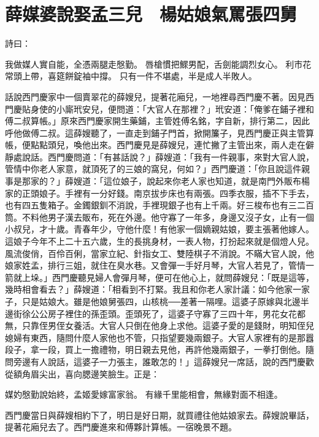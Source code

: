 %

\chapter{薛媒婆說娶孟三兒　楊姑娘氣罵張四舅}

詩曰：

我做媒人實自能，全憑兩腿走慇勤。
唇槍慣把鰥男配，舌劍能調烈女心。
利市花常頭上帶，喜筵餅錠袖中撐。
只有一件不堪處，半是成人半敗人。

話說西門慶家中一個賣翠花的薛嫂兒，提著花廂兒，一地裡尋西門慶不著。因見西門慶貼身使的小廝玳安兒，便問道：「大官人在那裡？」玳安道：「俺爹在鋪子裡和傅二叔算帳。」原來西門慶家開生藥鋪，主管姓傅名銘，字自新，排行第二，因此呼他做傅二叔。這薛嫂聽了，一直走到鋪子門首，掀開簾子，見西門慶正與主管算帳，便點點頭兒，喚他出來。西門慶見是薛嫂兒，連忙撇了主管出來，兩人走在僻靜處說話。西門慶問道：「有甚話說？」薛嫂道：「我有一件親事，來對大官人說，管情中你老人家意，就頂死了的三娘的窩兒，何如？」西門慶道：「你且說這件親事是那家的？」薛嫂道：「這位娘子，說起來你老人家也知道，就是南門外販布楊家的正頭娘子。手裡有一分好錢。南京拔步床也有兩張。四季衣服，插不下手去，也有四五隻箱子。金鐲銀釧不消說，手裡現銀子也有上千兩。好三梭布也有三二百筒。不料他男子漢去販布，死在外邊。他守寡了一年多，身邊又沒子女，止有一個小叔兒，才十歲。青春年少，守他什麼！有他家一個嫡親姑娘，要主張著他嫁人。這娘子今年不上二十五六歲，生的長挑身材，一表人物，打扮起來就是個燈人兒。風流俊俏，百伶百俐，當家立紀、針指女工、雙陸棋子不消說。不瞞大官人說，他娘家姓孟，排行三姐，就住在臭水巷。又會彈一手好月琴，大官人若見了，管情一箭就上垛。」西門慶聽見婦人會彈月琴，便可在他心上，就問薛嫂兒：「既是這等，幾時相會看去？」薛嫂道：「相看到不打緊。我且和你老人家計議：如今他家一家子，只是姑娘大。雖是他娘舅張四，山核桃──差著一隔哩。這婆子原嫁與北邊半邊街徐公公房子裡住的孫歪頭。歪頭死了，這婆子守寡了三四十年，男花女花都無，只靠侄男侄女養活。大官人只倒在他身上求他。這婆子愛的是錢財，明知侄兒媳婦有東西，隨問什麼人家他也不管，只指望要幾兩銀子。大官人家裡有的是那囂段子，拿一段，買上一擔禮物，明日親去見他，再許他幾兩銀子，一拳打倒他。隨問旁邊有人說話，這婆子一力張主，誰敢怎的！」這薛嫂兒一席話，說的西門慶歡從額角眉尖出，喜向腮邊笑臉生。正是：

媒妁慇勤說始終，孟姬愛嫁富家翁。
有緣千里能相會，無緣對面不相逢。

西門慶當日與薛嫂相約下了，明日是好日期，就買禮往他姑娘家去。薛嫂說畢話，提著花廂兒去了。西門慶進來和傅夥計算帳。一宿晚景不題。

